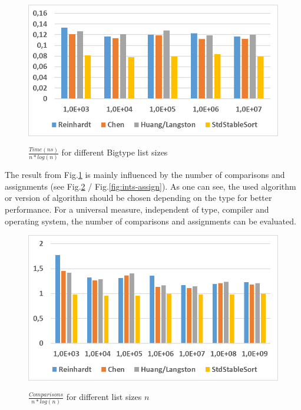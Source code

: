 \documentclass[11pt,pdftex,a4paper, twocolumn]{article}
\begin{document}
\begin{figure}[H]
\includegraphics[width=\linewidth]{Diagramm-Bilder/big-beidesTeuer.JPG} \\
\caption{ $ \frac{Time(ns)}{n*log(n)} $ for different Bigtype list sizes } \label{fig:big-beides-Teuer}
\end{figure}
The result from Fig.\ref{fig:big-beides-Teuer} is mainly influenced by the number of comparisons and assignments (see Fig.\ref{fig:ints-comp} / Fig.\ref{fig:ints-assign}). As one can see, the used algorithm or version of algorithm should be chosen depending on the type for better performance. For a universal measure, independent of type, compiler and operating system, the number of comparisons and assignments can be evaluated. \\
\begin{figure}[H]
\includegraphics[width=\linewidth]{Diagramm-Bilder/ints-comparisons.JPG} \\
\caption{ $ \frac{Comparisons}{n*log(n)} $ for different list sizes $ n $ } \label{fig:ints-comp}
\end{figure}
\end{document}
